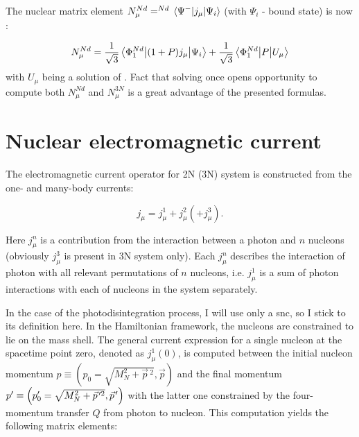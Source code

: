     The nuclear matrix element $N_\mu^{Nd} = ^{Nd} \matrixel{\Psi^{-}}{j_\mu}{\Psi_i}$ 
    (with $\Psi_i$ - bound state) is now \cite{GLOCKLE_report_1996, skibinski_prc_2003}:

    \begin{equation}
        N_\mu^{N d}=\frac{1}{\sqrt{3}} \matrixel{\Phi_1^{N d}}{(1+P) j_\mu}{\Psi_i}
        +\frac{1}{\sqrt{3}} \matrixel{\Phi_1^{N d}}{P}{U_\mu}
    \end{equation}
    with $U_\mu$ being a solution of .
    Fact that solving once  opens opportunity to compute both  $N_{\mu}^{Nd}$
    and $N_{\mu}^{3N}$ is a great advantage of the presented formulas. 


    \section{Nuclear electromagnetic current}
    \label{sec_current}
    
    The electromagnetic current operator for 2N (3N) system is constructed 
    from the one- and many-body currents:
    
    \begin{equation}
        j_\mu = j_\mu^1 + j_\mu^2 (+ j_\mu^3).
        \label{j_mu_gen}
    \end{equation}

    Here $j_\mu^n$ is a contribution from the interaction between a photon and 
    $n$ nucleons (obviously $j_\mu^3$ is present in 3N system only).
    Each $j_\mu^n$ describes the interaction of photon with all relevant permutations of $n$ nucleons,
    i.e. $j_\mu^1$ is a sum of photon interactions with each of nucleons in the system separately. 



    In the case of the photodisintegration process, I will use only a \gls{snc},
    so I stick to its definition here.
    In the Hamiltonian framework, the nucleons are constrained to lie on the mass shell.
    The general current expression for a
    single nucleon at the spacetime point zero, denoted as $j^1_\mu(0)$, is computed between the initial nucleon momentum
    $p \equiv\left(p_0=\sqrt{M_N^2+\vec{p}\,^2}, \vec{p}\right)$
    and the final momentum
    $p^{\prime} \equiv\left(p_0^{\prime}=\sqrt{M_N^2+\pvec{p}^{2}}, \pvec{p}\right)$
    with the latter one constrained by the four-momentum transfer $Q$ from photon to nucleon.
    This computation yields the following matrix elements:

